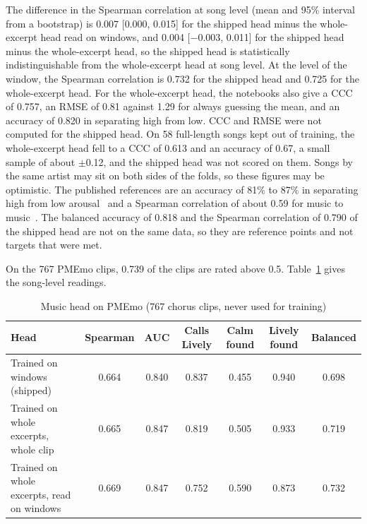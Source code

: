The difference in the Spearman correlation at song level (mean and 95\% interval from a bootstrap) is 0.007 [0.000, 0.015] for the shipped head minus the whole-excerpt head read on windows, and 0.004 [$-0.003$, 0.011] for the shipped head minus the whole-excerpt head, so the shipped head is statistically indistinguishable from the whole-excerpt head at song level. At the level of the window, the Spearman correlation is 0.732 for the shipped head and 0.725 for the whole-excerpt head. For the whole-excerpt head, the notebooks also give a CCC of 0.757, an RMSE of 0.81 against 1.29 for always guessing the mean, and an accuracy of 0.820 in separating high from low. CCC and RMSE were not computed for the shipped head. On 58 full-length songs kept out of training, the whole-excerpt head fell to a CCC of 0.613 and an accuracy of 0.67, a small sample of about $\pm$0.12, and the shipped head was not scored on them. Songs by the same artist may sit on both sides of the folds, so these figures may be optimistic. The published references are an accuracy of 81\% to 87\% in separating high from low arousal~\cite{sun2023segmented} and a Spearman correlation of about 0.59 for music to music~\cite{zhang2026generalisation}. The balanced accuracy of 0.818 and the Spearman correlation of 0.790 of the shipped head are not on the same data, so they are reference points and not targets that were met.

On the 767 PMEmo clips, 0.739 of the clips are rated above 0.5. Table~\ref{tab:ai-pmemo} gives the song-level readings.

\begin{table}[htbp]
    \centering
    \caption{Music head on PMEmo (767 chorus clips, never used for training)}\label{tab:ai-pmemo}
    \footnotesize
    \setlength{\tabcolsep}{3pt}
    \renewcommand{\arraystretch}{1.2}
    \begin{tabular}{|>{\raggedright\arraybackslash}p{}|c|c|c|c|c|c|}
        \hline
        \textbf{Head} & \textbf{Spearman} & \textbf{AUC} & \textbf{Calls Lively} & \textbf{Calm found} & \textbf{Lively found} & \textbf{Balanced} \\
        \hline
        Trained on windows (shipped) & 0.664 & 0.840 & 0.837 & 0.455 & 0.940 & 0.698 \\
        \hline
        Trained on whole excerpts, whole clip & 0.665 & 0.847 & 0.819 & 0.505 & 0.933 & 0.719 \\
        \hline
        Trained on whole excerpts, read on windows & 0.669 & 0.847 & 0.752 & 0.590 & 0.873 & 0.732 \\
        \hline
    \end{tabular}
\end{table}

